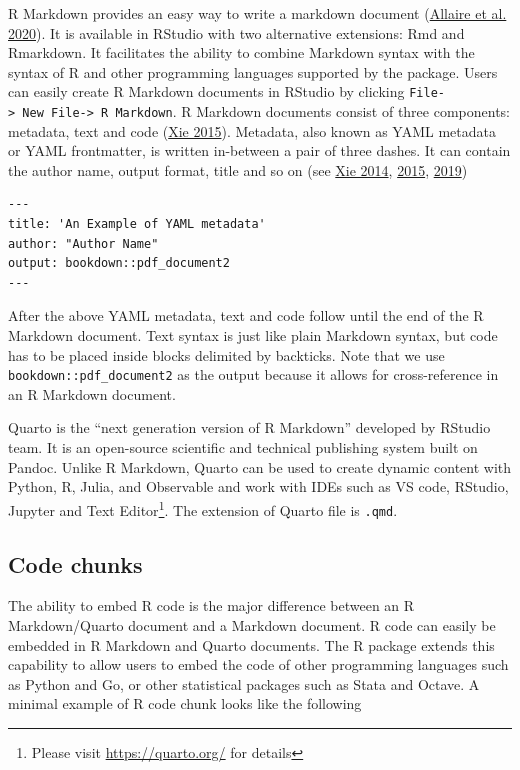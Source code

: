 R Markdown provides an easy way to write a markdown document (\protect\hyperlink{ref-rmarkdown}{Allaire et al. 2020}). It is available in RStudio with two alternative extensions: Rmd and Rmarkdown. It facilitates the ability to combine Markdown syntax with the syntax of R and other programming languages supported by the  package. Users can easily create R Markdown documents in RStudio by clicking \texttt{File-\textgreater{}\ New\ File-\textgreater{}\ R\ Markdown}. R Markdown documents consist of three components: metadata, text and code (\protect\hyperlink{ref-xie2015}{Xie 2015}). Metadata, also known as YAML metadata or YAML frontmatter, is written in-between a pair of three dashes. It can contain the author name, output format, title and so on (see \protect\hyperlink{ref-xie2014}{Xie 2014}, \protect\hyperlink{ref-xie2015}{2015}, \protect\hyperlink{ref-xie2019}{2019})

\begin{verbatim}
---
title: 'An Example of YAML metadata'
author: "Author Name"
output: bookdown::pdf_document2
---
\end{verbatim}

After the above YAML metadata, text and code follow until the end of the R Markdown document. Text syntax is just like plain Markdown syntax, but code has to be placed inside blocks delimited by backticks. Note that we use \texttt{bookdown::pdf\_document2} as the output because it allows for cross-reference in an R Markdown document.

Quarto is the ``next generation version of R Markdown'' developed by RStudio team. It is an open-source scientific and technical publishing system built on Pandoc. Unlike R Markdown, Quarto can be used to create dynamic content with Python, R, Julia, and Observable and work with IDEs such as VS code, RStudio, Jupyter and Text Editor\footnote{Please visit \url{https://quarto.org/} for details}. The extension of Quarto file is \texttt{.qmd}.

\hypertarget{sec-chunks}{%
\subsection{Code chunks}\label{sec-chunks}}

The ability to embed R code is the major difference between an R Markdown/Quarto document and a Markdown document. R code can easily be embedded in R Markdown and Quarto documents. The R  package extends this capability to allow users to embed the code of other programming languages such as Python and Go, or other statistical packages such as Stata and Octave. A minimal example of R code chunk looks like the following

